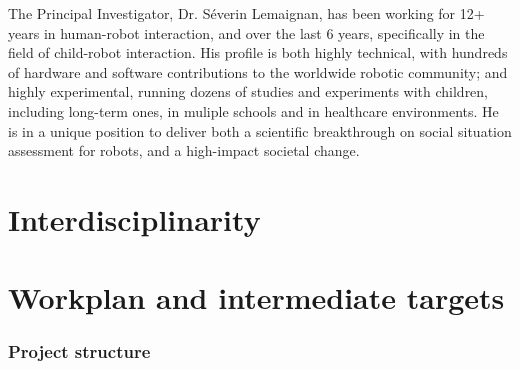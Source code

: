 \documentclass[11pt]{report}
\begin{document}
The Principal Investigator, Dr.  Séverin Lemaignan, has been working for 12+
years in human-robot interaction, and over the last 6 years, specifically in the
field of child-robot interaction.  His profile is both highly technical, with
hundreds of hardware and software contributions to the worldwide robotic
community; and highly experimental, running dozens of studies and experiments
with children, including long-term ones, in muliple schools and in healthcare
environments. He is in a unique position to deliver both a scientific
breakthrough on social situation assessment for robots, and a high-impact
societal change.

\section{Interdisciplinarity}



\newpage
\section{Workplan and intermediate targets}\label{workplan}





\subsubsection{Project structure}
\end{document}
